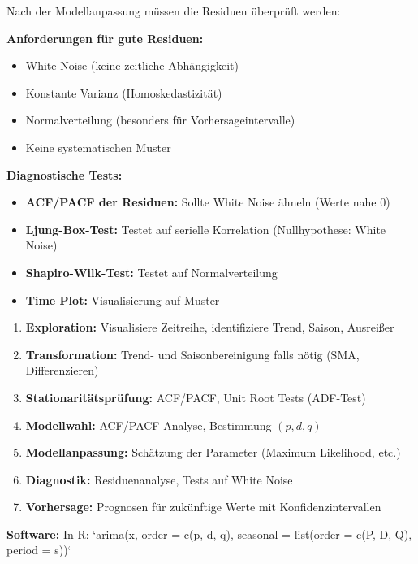 Nach der Modellanpassung müssen die Residuen überprüft werden:

\textbf{Anforderungen für gute Residuen:}
\begin{itemize}[leftmargin=1.5em]
    \item White Noise (keine zeitliche Abhängigkeit)
    \item Konstante Varianz (Homoskedastizität)
    \item Normalverteilung (besonders für Vorhersageintervalle)
    \item Keine systematischen Muster
\end{itemize}

\textbf{Diagnostische Tests:}
\begin{itemize}[leftmargin=1.5em]
    \item \textbf{ACF/PACF der Residuen:} Sollte White Noise ähneln (Werte nahe 0)
    \item \textbf{Ljung-Box-Test:} Testet auf serielle Korrelation (Nullhypothese: White Noise)
    \item \textbf{Shapiro-Wilk-Test:} Testet auf Normalverteilung
    \item \textbf{Time Plot:} Visualisierung auf Muster
\end{itemize}


\begin{enumerate}[leftmargin=1.5em]
    \item \textbf{Exploration:} Visualisiere Zeitreihe, identifiziere Trend, Saison, Ausreißer
    \item \textbf{Transformation:} Trend- und Saisonbereinigung falls nötig (SMA, Differenzieren)
    \item \textbf{Stationaritätsprüfung:} ACF/PACF, Unit Root Tests (ADF-Test)
    \item \textbf{Modellwahl:} ACF/PACF Analyse, Bestimmung $(p, d, q)$
    \item \textbf{Modellanpassung:} Schätzung der Parameter (Maximum Likelihood, etc.)
    \item \textbf{Diagnostik:} Residuenanalyse, Tests auf White Noise
    \item \textbf{Vorhersage:} Prognosen für zukünftige Werte mit Konfidenzintervallen
\end{enumerate}

\textbf{Software:} In R: `arima(x, order = c(p, d, q), seasonal = list(order = c(P, D, Q), period = s))`


